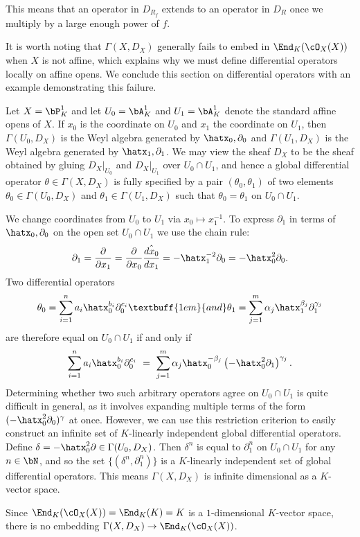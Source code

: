 This means that an operator in $D_{R_f}$ extends to an operator in $D_{R}$ once we multiply by a large enough power of $f$.

\bigskip

It is worth noting that $\Gamma(X,D_X)$ generally fails to embed in $\End_K(\cO_X(X))$ when $X$ is not affine, which explains why we must define differential operators locally on affine opens. We conclude this section on differential operators with an example demonstrating this failure.
\begin{example}\label{example:diff-op-on-proj}
	Let $X = \bP^1_K$ and let $U_0 = \bA^1_K$ and $U_1 = \bA^1_K$ denote the standard affine opens of $X$. If $x_0$ is the coordinate on $U_0$ and $x_1$ the coordinate on $U_1$, then $\Gamma(U_0,D_X)$ is the Weyl algebra generated by $\hatx_0,\partial_0$ and $\Gamma(U_1,D_X)$ is the Weyl algebra generated by $\hatx_1,\partial_1$. We may view the sheaf $D_X$ to be the sheaf obtained by gluing $D_X|_{U_0}$ and $D_X|_{U_1}$ over $U_0\cap U_1$, and hence a global differential operator $\theta \in \Gamma(X,D_X)$ is fully specified by a pair $(\theta_0,\theta_1)$ of two elements $\theta_0 \in \Gamma(U_0, D_X)$ and $\theta_1 \in \Gamma(U_1,D_X)$ such that $\theta_0 = \theta_1$ on $U_0\cap U_1$.

	We change coordinates from $U_0$ to $U_1$ via $x_0 \mapsto x_1^{-1}$. To express $\partial_1$ in terms of $\hatx_0,\partial_0$ on the open set $U_0\cap U_1$ we use the chain rule:
	\begin{align*}
		\partial_1 = \frac{\partial}{\partial x_1} = \frac{\partial}{\partial x_0}\hat{\frac{dx_0}{dx_1}} = -\hatx_1^{-2}\partial_0 = -\hatx_0^2\partial_0.
	\end{align*}
	Two differential operators
	\begin{align*}
		\theta_0 = \sum_{i=1}^n a_i\hatx_0^{b_i} \partial_0^{c_i} \textbuff{1em}{and} \theta_1 = \sum_{j=1}^m \alpha_j\hatx_1^{\beta_j} \partial_1^{\gamma_j}
	\end{align*}
	are therefore equal on $U_0\cap U_1$ if and only if
	\begin{align*}
		\sum_{i=1}^n a_i\hatx_0^{b_i} \partial_0^{c_i} ~=~ \sum_{j=1}^m \alpha_j\hatx_0^{-\beta_j} \left(-\hatx_0^2\partial_1\right)^{\gamma_j}.
	\end{align*}
	Determining whether two such arbitrary operators agree on $U_0\cap U_1$ is quite difficult in general, as it involves expanding multiple terms of the form $(-\hatx_0^2\partial_0)^{\gamma}$ at once. However, we can use this restriction criterion to easily construct an infinite set of $K$-linearly independent global differential operators. Define $\delta = -\hatx_0^2\partial \in \Gamma(U_0,D_X)$. Then $\delta^n$ is equal to $\partial_1^n$ on $U_0\cap U_1$ for any $n \in \bN$, and so the set $\{(\delta^n,\partial_1^n)\}$ is a $K$-linearly independent set of global differential operators. This means $\Gamma(X,D_X)$ is infinite dimensional as a $K$-vector space.

	Since $\End_K(\cO_X(X)) = \End_K(K) = K$ is a $1$-dimensional $K$-vector space, there is no embedding $\Gamma(X,D_X) \to \End_K(\cO_X(X))$.
\end{example}

